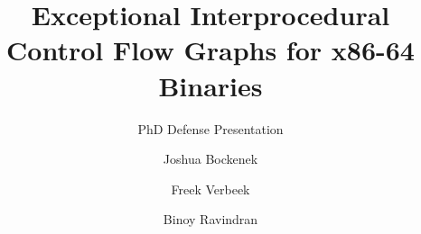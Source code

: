 \title[EICFGs for x86-64 Binaries]{Exceptional Interprocedural Control Flow Graphs
for x86-64 Binaries}
\subtitle{PhD Defense Presentation}
\author[J.\ Bockenek et al.]{Joshua Bockenek \and Freek Verbeek \and Binoy Ravindran}
\subject{Static Binary Analysis}
\date{}
